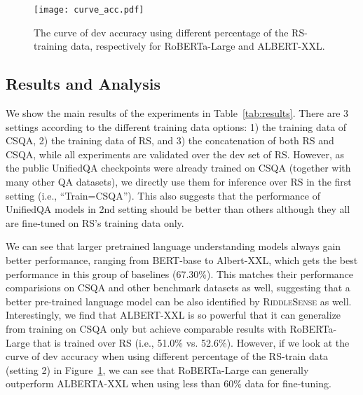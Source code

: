 \begin{figure}[t]
	\centering 
	\texttt{[image: curve\_acc.pdf]}
	\caption{The curve of dev accuracy using different percentage of the RS-training data, respectively for RoBERTa-Large and ALBERT-XXL. }
	\label{fig:curve} 
\end{figure}

\subsection{Results and Analysis}
\label{sec:result}

We show the main results of the experiments in Table~\ref{tab:results}.
There are 3 settings according to the different training data options: 1) the training data of CSQA, 2) the training data of RS, and 3) the concatenation of both RS and CSQA, while all experiments are validated over the dev set of RS.
However, as the public UnifiedQA checkpoints were already trained on CSQA (together with many other QA datasets), we directly use them for inference over RS in the first setting (i.e., ``Train=CSQA'').
This also suggests that the performance of UnifiedQA models in 2nd setting should be better than others although they all are fine-tuned on RS's training data only.


We can see that larger pretrained language understanding models always gain better performance, ranging from BERT-base to {Albert-XXL}, which gets the best performance in this group of baselines (67.30\%).
This matches their performance comparisions on CSQA and other benchmark datasets as well, suggesting that a better pre-trained language model can be also identified by \textsc{RiddleSense} as well.
Interestingly, we find that ALBERT-XXL is so powerful that it can generalize from training on CSQA only but achieve comparable results with RoBERTa-Large that is trained over RS (i.e., 51.0\% vs. 52.6\%).
However, if we look at the curve of dev accuracy when using different percentage of the RS-train data (setting 2) in Figure~\ref{fig:curve}, 
we can see that RoBERTa-Large can generally outperform ALBERTA-XXL when using less than 60\% data for fine-tuning.



